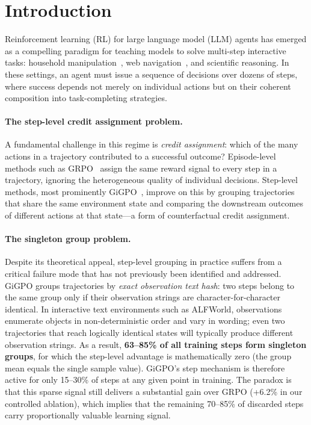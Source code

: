 \documentclass{article}
\begin{document}
\section{Introduction}
\label{sec:intro}

Reinforcement learning (RL) for large language model (LLM) agents has emerged as
a compelling paradigm for teaching models to solve multi-step interactive tasks:
household manipulation~\citep{shridhar2021alfworld}, web navigation~\citep{yao2022webshop},
and scientific reasoning.
In these settings, an agent must issue a sequence of decisions over dozens of
steps, where success depends not merely on individual actions but on their
coherent composition into task-completing strategies.

\paragraph{The step-level credit assignment problem.}
A fundamental challenge in this regime is \emph{credit assignment}: which
of the many actions in a trajectory contributed to a successful outcome?
Episode-level methods such as GRPO~\citep{shao2024deepseekmath} assign the same
reward signal to every step in a trajectory, ignoring the heterogeneous quality
of individual decisions.
Step-level methods, most prominently GiGPO~\citep{feng2025gigpo}, improve on
this by grouping trajectories that share the same environment state and comparing
the downstream outcomes of different actions at that state---a form of
counterfactual credit assignment.

\paragraph{The singleton group problem.}
Despite its theoretical appeal, step-level grouping in practice suffers from
a critical failure mode that has not previously been identified and addressed.
GiGPO groups trajectories by \emph{exact observation text hash}: two steps
belong to the same group only if their observation strings are character-for-character
identical.
In interactive text environments such as ALFWorld, observations enumerate objects
in non-deterministic order and vary in wording; even two trajectories that reach
logically identical states will typically produce different observation strings.
As a result, \textbf{63--85\% of all training steps form singleton groups},
for which the step-level advantage is mathematically zero (the group mean equals
the single sample value).
GiGPO's step mechanism is therefore active for only 15--30\% of steps
at any given point in training.
The paradox is that this sparse signal still delivers a substantial gain over
GRPO (+6.2\% in our controlled ablation), which implies that the remaining
70--85\% of discarded steps carry proportionally valuable learning signal.
\end{document}

